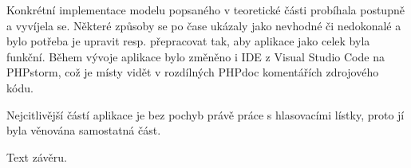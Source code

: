 

Konkrétní implementace modelu popsaného v teoretické části probíhala postupně a vyvíjela se. Některé způsoby se po čase ukázaly jako nevhodné či nedokonalé a bylo potřeba je upravit resp. přepracovat tak, aby aplikace jako celek byla funkční. Během vývoje aplikace bylo změněno i IDE z Visual Studio Code na PHPstorm, což je místy vidět v rozdílných PHPdoc komentářích zdrojového kódu.


\clearpage




 \label{section:prihlasovani}


\clearpage
{}




 \label{section:zpracovaniHlasu}
Nejcitlivější částí aplikace je bez pochyb právě práce s hlasovacími lístky, proto jí byla věnována samostatná část.




Text závěru.



